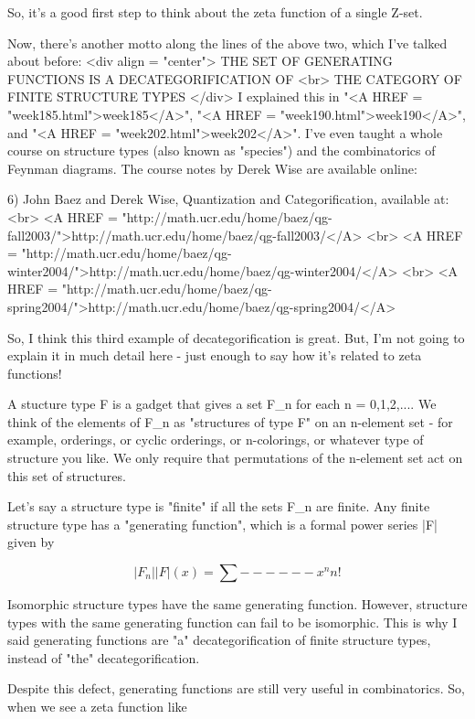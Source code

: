 So, it's a good first step to think about the zeta function of a single 
Z-set.

Now, there's another motto along the lines of the above two, which I've
talked about before:
<div align = "center">
   THE SET OF GENERATING FUNCTIONS IS A DECATEGORIFICATION OF <br>
                 THE CATEGORY OF FINITE STRUCTURE TYPES
</div>
I explained this in "<A HREF = "week185.html">week185</A>", "<A HREF = "week190.html">week190</A>", and "<A HREF = "week202.html">week202</A>".  I've even taught a
whole course on structure types (also known as "species") and the 
combinatorics of Feynman diagrams.  The course notes by Derek Wise are 
available online:

6) John Baez and Derek Wise, Quantization and Categorification, available at:<br>
<A HREF = "http://math.ucr.edu/home/baez/qg-fall2003/">http://math.ucr.edu/home/baez/qg-fall2003/</A> <br>
<A HREF = "http://math.ucr.edu/home/baez/qg-winter2004/">http://math.ucr.edu/home/baez/qg-winter2004/</A> <br>
<A HREF = "http://math.ucr.edu/home/baez/qg-spring2004/">http://math.ucr.edu/home/baez/qg-spring2004/</A> 

So, I think this third example of decategorification is great.  But, I'm not 
going to explain it in much detail here - just enough to say how it's related
to zeta functions!

A stucture type F is a gadget that gives a set F_{n}
for each n = 0,1,2,....
We think of the elements of F_{n} 
as "structures of type F" on an n-element 
set - for example, orderings, or cyclic orderings, or n-colorings, or 
whatever type of structure you like.  We only require that permutations of 
the n-element set act on this set of structures.  

Let's say a structure type is "finite" if all the
sets F_{n} are finite.
Any finite structure type has a "generating function", 
which is a formal power series |F| given by


$$

              |F_{n}|
|F|(x) =  \sum  ------  x^{n}
               n! 
$$
    

Isomorphic structure types have the same generating function.
However, structure types with the same generating function can fail to
be isomorphic.  This is why I said generating functions are
"a" decategorification of finite structure types, instead of
"the" decategorification.

Despite this defect, generating functions are still very useful in 
combinatorics.  So, when we see a zeta function like

